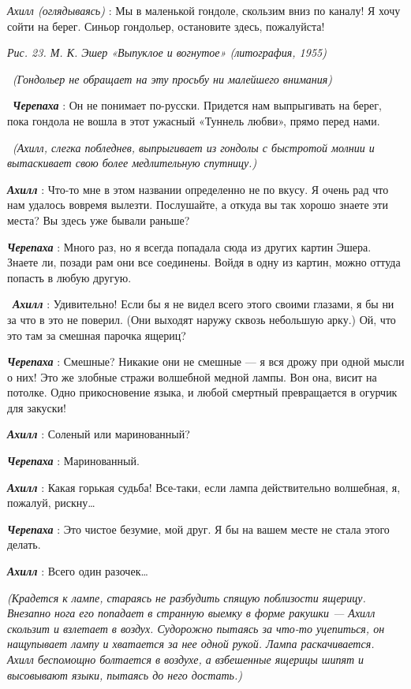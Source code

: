\emph{Ахилл (оглядываясь)} : Мы в маленькой гондоле, скользим вниз по каналу! Я хочу сойти на берег. Синьор гондольер, остановите здесь, пожалуйста!

\emph{Рис. 23. М. К. Эшер «Выпуклое и вогнутое» (литография, 1955)}

~\emph{(Гондольер не обращает на эту просьбу ни малейшего внимания)}

~\emph{\textbf{Черепаха}} : Он не понимает по-русски. Придется нам выпрыгивать на берег, пока гондола не вошла в этот ужасный «Туннель любви», прямо перед нами.

~\emph{(Ахилл, слегка побледнев, выпрыгивает из гондолы с быстротой молнии и вытаскивает свою более медлительную спутницу.)}

\emph{\textbf{Ахилл}} : Что-то мне в этом названии определенно не по вкусу. Я очень рад что нам удалось вовремя вылезти. Послушайте, а откуда вы так хорошо знаете эти места? Вы здесь уже бывали раньше?

\emph{\textbf{Черепаха}} : Много раз, но я всегда попадала сюда из других картин Эшера. Знаете ли, позади рам они все соединены. Войдя в одну из картин, можно оттуда попасть в любую другую.

~\emph{\textbf{Ахилл}} : Удивительно! Если бы я не видел всего этого своими глазами, я бы ни за что в это не поверил. (Они выходят наружу сквозь небольшую арку.) Ой, что это там за смешная парочка ящериц?

\emph{\textbf{Черепаха}} : Смешные? Никакие они не смешные --- я вся дрожу при одной мысли о них! Это же злобные стражи волшебной медной лампы. Вон она, висит на потолке. Одно прикосновение языка, и любой смертный превращается в огурчик для закуски!

\emph{\textbf{Ахилл}} : Соленый или маринованный?

\emph{\textbf{Черепаха}} : Маринованный.

\emph{\textbf{Ахилл}} : Какая горькая судьба! Все-таки, если лампа действительно волшебная, я, пожалуй, рискну\ldots{}

\emph{\textbf{Черепаха}} : Это чистое безумие, мой друг. Я бы на вашем месте не стала этого делать.

\emph{\textbf{Ахилл}} : Всего один разочек\ldots{}

\emph{(Крадется к лампе, стараясь не разбудить спящую поблизости ящерицу. Внезапно нога его попадает в странную выемку в форме ракушки --- Ахилл скользит и взлетает в воздух. Судорожно пытаясь за что-то уцепиться, он нащупывает лампу и хватается за нее одной рукой. Лампа раскачивается. Ахилл беспомощно болтается в воздухе, а взбешенные ящерицы шипят и высовывают языки, пытаясь до него достать.)}

